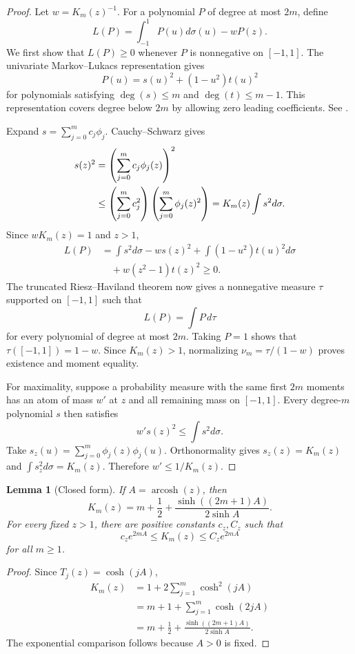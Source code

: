 \documentclass[twoside]{article}
\newtheorem{lemma}[theorem]{Lemma}
\newcommand{\1}{\mathbf 1}
\begin{document}
\begin{proof}
Let $w=K_m(z)^{-1}$. For a polynomial $P$ of degree at most $2m$, define
\[
 L(P)=\int_{-1}^1P(u)d\sigma(u)-wP(z).
\]
We first show that $L(P)\ge0$ whenever $P$ is nonnegative on $[-1,1]$.
The univariate Markov--Lukacs representation gives
\[
 P(u)=s(u)^2+(1-u^2)t(u)^2
\]
for polynomials satisfying $\deg(s)\le m$ and $\deg(t)\le m-1$. This
representation covers degree below $2m$ by allowing zero leading
coefficients. See \citet[Proposition 2.5.1]{wu2020polynomial}.

Expand $s=\sum_{j=0}^mc_j\phi_j$. Cauchy--Schwarz gives
\begin{align}
 s(z)^2
 &=\left(\sum_{j=0}^mc_j\phi_j(z)\right)^2\notag\\
 &\le\left(\sum_{j=0}^mc_j^2\right)
 \left(\sum_{j=0}^m\phi_j(z)^2\right)
 =K_m(z)\int s^2d\sigma.
 \label{eq:app-kernel-cs}
\end{align}
Since $wK_m(z)=1$ and $z>1$,
\begin{align*}
 L(P)
 &=\int s^2d\sigma-ws(z)^2
 +\int(1-u^2)t(u)^2d\sigma\\
 &\quad+w(z^2-1)t(z)^2\ge0.
\end{align*}
The truncated Riesz--Haviland theorem
\citep[Theorem 2.5.2]{wu2020polynomial} now gives a nonnegative measure
$\tau$ supported on $[-1,1]$ such that
\[
 L(P)=\int P\,d\tau
\]
for every polynomial of degree at most $2m$. Taking $P=1$ shows that
$\tau([-1,1])=1-w$. Since $K_m(z)>1$, normalizing
$\nu_m=\tau/(1-w)$ proves existence and moment equality.

For maximality, suppose a probability measure with the same first $2m$
moments has an atom of mass $w'$ at $z$ and all remaining mass on
$[-1,1]$. Every degree-$m$ polynomial $s$ then satisfies
\[
 w's(z)^2\le\int s^2d\sigma.
\]
Take $s_z(u)=\sum_{j=0}^m\phi_j(z)\phi_j(u)$. Orthonormality gives
$s_z(z)=K_m(z)$ and $\int s_z^2d\sigma=K_m(z)$. Therefore
$w'\le1/K_m(z)$.
\end{proof}

\begin{lemma}[Closed form]
\label{lem:kernel-form}
If $A=\operatorname{arcosh}(z)$, then
\[
 K_m(z)=m+\frac12+\frac{\sinh((2m+1)A)}{2\sinh A}.
\]
For every fixed $z>1$, there are positive constants $c_z,C_z$ such that
\[
 c_ze^{2mA}\le K_m(z)\le C_ze^{2mA}
\]
for all $m\ge1$.
\end{lemma}

\begin{proof}
Since $T_j(z)=\cosh(jA)$,
\begin{align*}
 K_m(z)
 &=1+2\sum_{j=1}^m\cosh^2(jA)\\
 &=m+1+\sum_{j=1}^m\cosh(2jA)\\
 &=m+\frac12+\frac{\sinh((2m+1)A)}{2\sinh A}.
\end{align*}
The exponential comparison follows because $A>0$ is fixed.
\end{proof}
\end{document}
